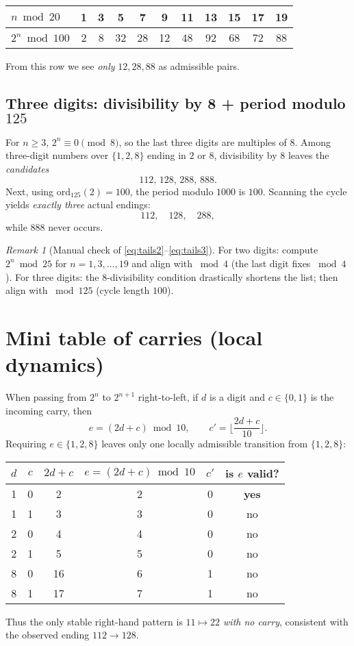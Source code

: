 \documentclass[12pt]{article}
\theoremstyle{plain}
\theoremstyle{remark}
\newtheorem*{remark}{Remark}
\begin{document}
\begin{center}
\renewcommand{\arraystretch}{1.05}
\begin{tabular}{@{}lcccccccccc@{}}
\toprule
$n\bmod 20$ & 1 & 3 & 5 & 7 & 9 & 11 & 13 & 15 & 17 & 19 \\
\midrule
$2^n\bmod 100$ & 2 & 8 & 32 & 28 & 12 & 48 & 92 & 68 & 72 & 88 \\
\bottomrule
\end{tabular}
\end{center}

From this row we see \emph{only} $12,28,88$ as admissible pairs.

\subsection*{Three digits: divisibility by 8 + period modulo $125$}
For $n\ge3$, $2^n\equiv0\pmod8$, so the last three digits are multiples of $8$. Among three-digit numbers over $\{1,2,8\}$ ending in $2$ or $8$, divisibility by $8$ leaves the \emph{candidates}
\[
112,\,128,\,288,\,888.
\]
Next, using $\mathrm{ord}_{125}(2)=100$, the period modulo $1000$ is $100$. Scanning the cycle yields \emph{exactly three} actual endings:
\begin{equation}\label{eq:tails3}
\boxed{112,\quad 128,\quad 288,}
\end{equation}
while $888$ never occurs.

\begin{remark}[Manual check of \eqref{eq:tails2}–\eqref{eq:tails3}]
For two digits: compute $2^n\bmod25$ for $n=1,3,\ldots,19$ and align with $\bmod4$ (the last digit fixes $\bmod4$). For three digits: the $8$-divisibility condition drastically shortens the list; then align with $\bmod125$ (cycle length $100$).
\end{remark}

\section{Mini table of carries (local dynamics)}
When passing from $2^n$ to $2^{n+1}$ right-to-left, if $d$ is a digit and $c\in\{0,1\}$ is the incoming carry, then
\[
e=(2d+c)\bmod10,\qquad c'=\Big\lfloor\frac{2d+c}{10}\Big\rfloor.
\]
Requiring $e\in\{1,2,8\}$ leaves only one locally admissible transition from $\{1,2,8\}$:
\begin{center}
\renewcommand{\arraystretch}{1.1}
\begin{tabular}{@{}cccccc@{}}
\toprule
$d$ & $c$ & $2d+c$ & $e=(2d+c)\bmod10$ & $c'$ & is $e$ valid? \\
\midrule
1 & 0 & 2  & 2 & 0 & \textbf{yes} \\
1 & 1 & 3  & 3 & 0 & no \\
2 & 0 & 4  & 4 & 0 & no \\
2 & 1 & 5  & 5 & 0 & no \\
8 & 0 & 16 & 6 & 1 & no \\
8 & 1 & 17 & 7 & 1 & no \\
\bottomrule
\end{tabular}
\end{center}
Thus the only stable right-hand pattern is \emph{$11\mapsto22$ with no carry}, consistent with the observed ending $112\to128$.
\end{document}
